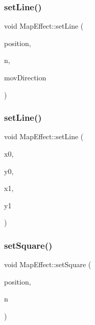 \subsubsection{\texorpdfstring{set\+Line()}{setLine()}\hspace{0.1cm}{\footnotesize\ttfamily [1/2]}}
{\footnotesize\ttfamily void Map\+Effect\+::set\+Line (\begin{DoxyParamCaption}\item[{sf\+::\+Vector2i}]{position,  }\item[{int}]{n,  }\item[{\mbox{\hyperlink{_enum_types_8hpp_a00ec4eba48da32d6cbdf827185fd3d34}{Move\+Direction}}}]{mov\+Direction }\end{DoxyParamCaption})}

\mbox{\label{class_map_effect_ac927f830b816bcf14d594db3c1d1e100}} 
\subsubsection{\texorpdfstring{set\+Line()}{setLine()}\hspace{0.1cm}{\footnotesize\ttfamily [2/2]}}
{\footnotesize\ttfamily void Map\+Effect\+::set\+Line (\begin{DoxyParamCaption}\item[{int}]{x0,  }\item[{int}]{y0,  }\item[{int}]{x1,  }\item[{int}]{y1 }\end{DoxyParamCaption})}

\mbox{\label{class_map_effect_a4c382be68e0b9dae8fb1f216c8cfc9a6}} 
\subsubsection{\texorpdfstring{set\+Square()}{setSquare()}}
{\footnotesize\ttfamily void Map\+Effect\+::set\+Square (\begin{DoxyParamCaption}\item[{sf\+::\+Vector2i}]{position,  }\item[{int}]{n }\end{DoxyParamCaption})}

